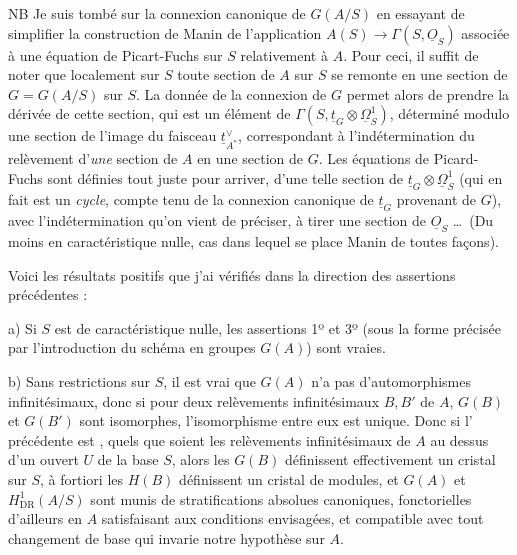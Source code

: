 \documentclass[11pt,a4paper]{article}
\begin{document}
NB Je suis tombé sur la connexion canonique de $G(A/S)$ en essayant de
simplifier la construction de Manin de l'application
$A(S)\to\Gamma(S,\underline{O}_S)$ associée à une équation de
Picart-Fuchs sur $S$\add{,} relativement à $A$. Pour ceci, il suffit
de noter que localement sur $S$ toute section de $A$ sur $S$ se remonte en une
section de $G=G(A/S)$ sur $S$. La donnée de la connexion de $G$ permet alors
de prendre la dérivée de cette section, qui est un élément de
$\Gamma(S,\underline{t}_G\otimes\underline{\Omega}^1_S)$, déterminé modulo
une section de l'image du faisceau $\underline{t}^{\vee}_{A^*}$, correspondant
à l'indétermination du relèvement d'\emph{une} section de $A$ en une section de
$G$. Les équations de Picard-Fuchs sont définies tout juste pour arriver, d'une
telle section de
\struck{\ill{}} $\underline{t}_G\otimes\underline{\Omega}^1_S$ (qui en fait est
un \emph{cycle}, compte tenu de la connexion canonique de
$\underline{t}_G$ provenant de $G$), avec l'indétermination qu'on vient de
préciser, à tirer une section de $\underline{O}_S$ \ldots\ (Du moins en
caractéristique nulle, cas dans lequel se place Manin de toutes
façons).

Voici les résultats positifs que j'ai vérifiés dans la direction des
assertions précédentes :

a) Si $S$ est de caractéristique nulle, les assertions 1º et 3º (sous la forme
précisée par l'introduction du schéma en groupes $G(A)$) sont vraies.

b) Sans restrictions sur $S$, il est vrai que $G(A)$ n'a pas d'automorphismes
infinitésimaux, donc si pour deux relèvements infinitésimaux 
$B,B'$ de $A$, $G(B)$ et $G(B')$ sont isomorphes, l'isomorphisme entre eux est
unique. Donc si
l'  précédente est 
, quels que soient les relèvements infinitésimaux de $A$ au
dessus d'un ouvert $U$ de la base $S$, alors les $G(B)$ définissent
effectivement un cristal  sur $S$, à fortiori les $H(B)$
définissent un cristal de modules, et $G(A)$ et $H^1_{\mathrm{DR}}(A/S)$ sont
munis de stratifications absolues canoniques, fonctorielles d'ailleurs en $A$
satisfaisant aux conditions envisagées, et compatible avec tout changement de
base qui invarie notre hypothèse sur $A$.
\end{document}
